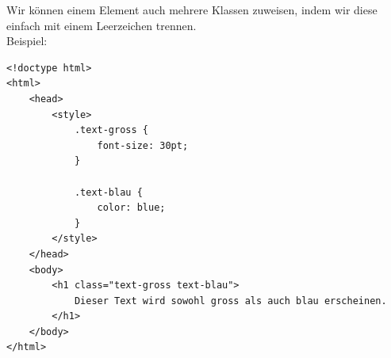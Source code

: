\documentclass[ngerman,11pt]{article}
\begin{document}

    Wir können einem Element auch mehrere Klassen zuweisen, indem wir diese einfach mit einem Leerzeichen trennen. \\

    Beispiel:

    \begin{lstlisting}[type=htmlcssjs]
<!doctype html>
<html>
    <head>
        <style>
            .text-gross {
                font-size: 30pt;
            }

            .text-blau {
                color: blue;
            }
        </style>
    </head>
    <body>
        <h1 class="text-gross text-blau">
            Dieser Text wird sowohl gross als auch blau erscheinen.
        </h1>
    </body>
</html>
    \end{lstlisting}
\end{document}

